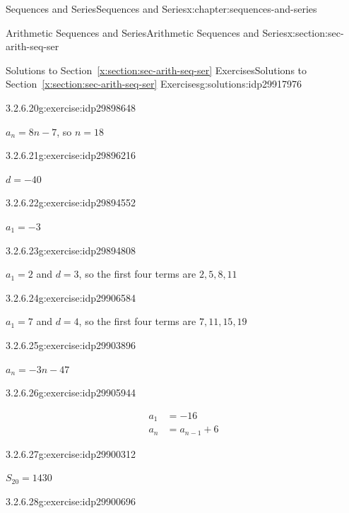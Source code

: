 \documentclass[twoside,10pt,]{book}
\newcommand{\xreffont}{\relax}
\numberwithin{equation}{section}
\newcommand{\amp}{&}
\begin{document}
\begin{chapterptx}{Sequences and Series}{}{Sequences and Series}{}{}{x:chapter:sequences-and-series}
\begin{sectionptx}{Arithmetic Sequences and Series}{}{Arithmetic Sequences and Series}{}{}{x:section:sec-arith-seq-ser}
\begin{solutions-subsection}{Solutions to Section~{\xreffont\ref*{x:section:sec-arith-seq-ser}} Exercises}{}{Solutions to Section~{\xreffont\ref*{x:section:sec-arith-seq-ser}} Exercises}{}{}{g:solutions:idp29917976}
\begin{divisionsolution}{3.2.6.20}{}{g:exercise:idp29898648}%
\par\smallskip%
\noindent\hypertarget{g:solution:idp29896856-main}{}\(a_n = 8n - 7\), so \(n = 18\)\end{divisionsolution}%
\begin{divisionsolution}{3.2.6.21}{}{g:exercise:idp29896216}%
\par\smallskip%
\noindent\hypertarget{g:solution:idp29898264-main}{}\(d=-40\)\end{divisionsolution}%
\begin{divisionsolution}{3.2.6.22}{}{g:exercise:idp29894552}%
\par\smallskip%
\noindent\hypertarget{g:solution:idp29894680-main}{}\(a_1=-3\)\end{divisionsolution}%
\begin{divisionsolution}{3.2.6.23}{}{g:exercise:idp29894808}%
\par\smallskip%
\noindent\hypertarget{g:solution:idp29902616-main}{}\(a_1=2\) and \(d=3\), so the first four terms are \(2, 5, 8, 11\)\end{divisionsolution}%
\begin{divisionsolution}{3.2.6.24}{}{g:exercise:idp29906584}%
\par\smallskip%
\noindent\hypertarget{g:solution:idp29901080-main}{}\(a_1=7\) and \(d=4\), so the first four terms are \(7, 11, 15, 19\)\end{divisionsolution}%
\begin{divisionsolution}{3.2.6.25}{}{g:exercise:idp29903896}%
\par\smallskip%
\noindent\hypertarget{g:solution:idp29905816-main}{}\(a_n =  - 3n - 47\)\end{divisionsolution}%
\begin{divisionsolution}{3.2.6.26}{}{g:exercise:idp29905944}%
\par\smallskip%
\noindent\hypertarget{g:solution:idp29899416-main}{}%
\begin{align*}
a_1\amp = -16\\
a_n\amp = a_{n-1}+6
\end{align*}
\end{divisionsolution}%
\begin{divisionsolution}{3.2.6.27}{}{g:exercise:idp29900312}%
\par\smallskip%
\noindent\hypertarget{g:solution:idp29903000-main}{}\(S_{20} = 1430\)\end{divisionsolution}%
\begin{divisionsolution}{3.2.6.28}{}{g:exercise:idp29900696}%

\end{divisionsolution}
\end{solutions-subsection}
\end{sectionptx}
\end{chapterptx}
\end{document}
